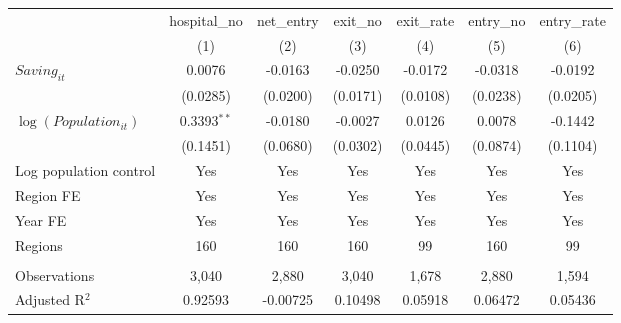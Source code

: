 \begingroup
\centering
\begin{tabular}{lcccccc}
   \toprule
                            & hospital\_no  & net\_entry  & exit\_no  & exit\_rate  & entry\_no  & entry\_rate \\    
                            & (1)           & (2)         & (3)       & (4)         & (5)        & (6)\\  
   \midrule 
   $Saving_{it}$            & 0.0076        & -0.0163     & -0.0250   & -0.0172     & -0.0318    & -0.0192\\   
                            & (0.0285)      & (0.0200)    & (0.0171)  & (0.0108)    & (0.0238)   & (0.0205)\\   
   $\log(Population_{it})$  & 0.3393$^{**}$ & -0.0180     & -0.0027   & 0.0126      & 0.0078     & -0.1442\\   
                            & (0.1451)      & (0.0680)    & (0.0302)  & (0.0445)    & (0.0874)   & (0.1104)\\   
   Log population control   & Yes           & Yes         & Yes       & Yes         & Yes        & Yes\\  
   Region FE                & Yes           & Yes         & Yes       & Yes         & Yes        & Yes\\  
   Year FE                  & Yes           & Yes         & Yes       & Yes         & Yes        & Yes\\  
   Regions                  & 160           & 160         & 160       & 99          & 160        & 99\\  
    \\
   Observations             & 3,040         & 2,880       & 3,040     & 1,678       & 2,880      & 1,594\\  
   Adjusted R$^2$           & 0.92593       & -0.00725    & 0.10498   & 0.05918     & 0.06472    & 0.05436\\  
   \bottomrule
\end{tabular}
\par\endgroup
